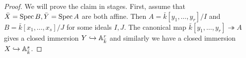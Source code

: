 \begin{proof}
	We will prove the claim in stages. First, assume that $\bar{X} = \Spec B,\bar{Y} = \Spec A$ are both affine. Then $A = \bar{k}[y_1,\ldots,y_r]/I$ and $B = \bar{k}[x_1,\ldots,x_s]/J$ for some ideals $I,J$. The canonical map $\bar{k}[y_1,\ldots,y_r] \twoheadrightarrow A$ gives a closed immersion $Y \hookrightarrow \AA_{\bar{k}}^r$ and similarly we have a closed immersion $X \hookrightarrow \AA_{\bar{k}}^s$.
\end{proof}
